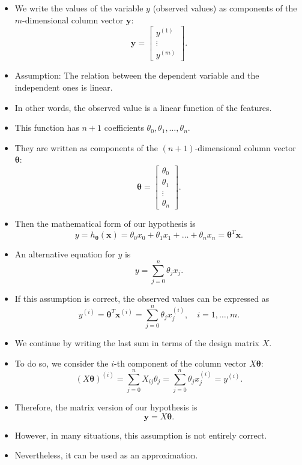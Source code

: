 \documentclass[10pt,american]{scrartcl}
\begin{document}
\begin{itemize}
\[\]
\item We write the values of the variable $y$ (observed values) as components
of the $m$-dimensional column vector $\mathbf{y}$:
\[
\mathbf{y}=\begin{bmatrix}y^{\left(1\right)}\\
\vdots\\
y^{\left(m\right)}
\end{bmatrix}.
\]
\item Assumption: The relation between the dependent variable and the independent
ones is linear.
\item In other words, the observed value is a linear function of the features.
\item This function has $n+1$ coefficients $\theta_{0},\theta_{1},\ldots,\theta_{n}$.
\item They are written as components of the $\left(n+1\right)$-dimensional
column vector $\boldsymbol{\theta}$:
\[
\boldsymbol{\theta}=\begin{bmatrix}\theta_{0}\\
\theta_{1}\\
\vdots\\
\theta_{n}
\end{bmatrix}.
\]
\item Then the mathematical form of our hypothesis is
\[
y=h_{\boldsymbol{\theta}}\left(\mathbf{x}\right)=\theta_{0}x_{0}+\theta_{1}x_{1}+\ldots+\theta_{n}x_{n}=\boldsymbol{\theta}^{T}\mathbf{x}.
\]
\item An alternative equation for $y$ is
\[
y=\sum_{j=0}^{n}\theta_{j}x_{j}.
\]
\item If this assumption is correct, the observed values can be expressed
as
\[
y^{\left(i\right)}=\boldsymbol{\theta}^{T}\mathbf{x}^{\left(i\right)}=\sum_{j=0}^{n}\theta_{j}x_{j}^{\left(i\right)},\quad i=1,\ldots,m.
\]
\item We continue by writing the last sum in terms of the design matrix
$X$.
\item To do so, we consider the $i$-th component of the column vector $X\boldsymbol{\theta}$:
\[
\left(X\boldsymbol{\theta}\right)^{\left(i\right)}=\sum_{j=0}^{n}X_{ij}\theta_{j}=\sum_{j=0}^{n}\theta_{j}x_{j}^{\left(i\right)}=y^{\left(i\right)}.
\]
\item Therefore, the matrix version of our hypothesis is
\[
\mathbf{y}=X\boldsymbol{\theta}.
\]
\item However, in many situations, this assumption is not entirely correct.
\item Nevertheless, it can be used as an approximation.

\end{itemize}
\end{document}
